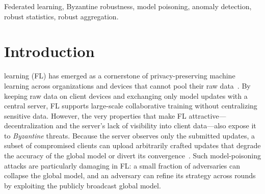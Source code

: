 \documentclass[journal]{IEEEtran}
\begin{document}
\begin{abstract}
filter's exclusion count is unchanged throughout. Because nothing measured discriminates among the settings, we derive the quantile from the threat model rather than tuning it: the re-scoring trigger is score-ordered and a coordinated adversary occupies the upper tail of the score distribution, so setting the quantile to $1-\epsilon_{\max}$ at the threat model's own bound retains every attacker in the temporal arm's view without assuming the realised count. That yields a $\mathbf{48.0\%}$ invocation reduction. We also report, rather than qualify away, the cost of our own exclusion rule: its quantile branch discards a fixed fraction of participants unconditionally, and on adversary-free rounds---where every exclusion is honest by construction---it discards $21.2$ to $22.2$ clients of $50$ per round, more than either baseline that is handed the malicious count. A shape-based rule that can abstain removes this floor but requires a separable score distribution, which reference capture destroys; choosing between the two is a trade we make explicit rather than a property we claim, and obtaining both at once is the principal problem this work leaves open.
\end{abstract}

\begin{IEEEkeywords}
Federated learning, Byzantine robustness, model poisoning, anomaly detection, robust statistics, robust aggregation.
\end{IEEEkeywords}

\section{Introduction}
\label{sec:introduction}


 learning (FL) has emerged as a cornerstone of privacy-preserving machine learning across organizations and devices that cannot pool their raw data~\cite{sandeepa2025federated}. By keeping raw data on client devices and exchanging only model updates with a central server, FL supports large-scale collaborative training without centralizing sensitive data. However, the very properties that make FL attractive---decentralization and the server's lack of visibility into client data---also expose it to \emph{Byzantine} threats. Because the server observes only the submitted updates, a subset of compromised clients can upload arbitrarily crafted updates that degrade the accuracy of the global model or divert its convergence~\cite{baruch2019little, fang2020local, shejwalkar2021manipulating}. Such model-poisoning attacks are particularly damaging in FL: a small fraction of adversaries can collapse the global model, and an adversary can refine its strategy across rounds by exploiting the publicly broadcast global model.
\end{document}

